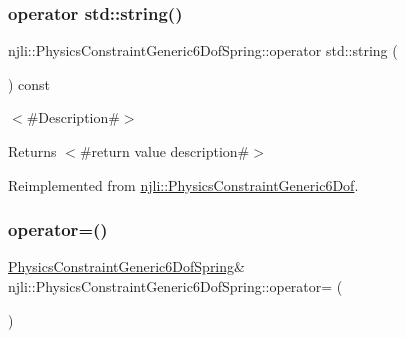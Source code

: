 \subsubsection{\texorpdfstring{operator std\+::string()}{operator std::string()}}
{\footnotesize\ttfamily njli\+::\+Physics\+Constraint\+Generic6\+Dof\+Spring\+::operator std\+::string (\begin{DoxyParamCaption}{ }\end{DoxyParamCaption}) const\hspace{0.3cm}{\ttfamily [virtual]}}

$<$\#\+Description\#$>$

\begin{DoxyReturn}{Returns}
$<$\#return value description\#$>$ 
\end{DoxyReturn}


Reimplemented from \mbox{\hyperlink{classnjli_1_1_physics_constraint_generic6_dof_a8989bd7a2e05a4abf8edcaa7468648f6}{njli\+::\+Physics\+Constraint\+Generic6\+Dof}}.

\mbox{\label{classnjli_1_1_physics_constraint_generic6_dof_spring_a213a2c40144478db8dbb877c6539dcb0}} 
\subsubsection{\texorpdfstring{operator=()}{operator=()}}
{\footnotesize\ttfamily \mbox{\hyperlink{classnjli_1_1_physics_constraint_generic6_dof_spring}{Physics\+Constraint\+Generic6\+Dof\+Spring}}\& njli\+::\+Physics\+Constraint\+Generic6\+Dof\+Spring\+::operator= (\begin{DoxyParamCaption}\item[{const \mbox{\hyperlink{classnjli_1_1_physics_constraint_generic6_dof_spring}{Physics\+Constraint\+Generic6\+Dof\+Spring}} \&}]{ }\end{DoxyParamCaption})\hspace{0.3cm}{\ttfamily [protected]}}

\mbox{\label{classnjli_1_1_physics_constraint_generic6_dof_spring_ad8d9013c4e17710207f13cf40d667cd1}} 
